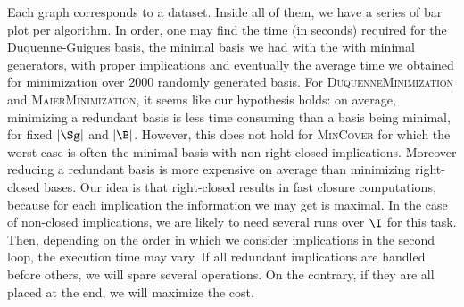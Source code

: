 \vspace{1.2em}

Each graph corresponds to a dataset. Inside all of them, we have a series
of bar plot per algorithm. In order, one may find the time (in seconds) required for the Duquenne-Guigues basis, the minimal basis we had with the
with minimal generators, with proper implications and eventually the average
time we obtained for minimization over 2000 randomly generated basis. For \textsc{DuquenneMinimization} and \textsc{MaierMinimization}, it seems like
our hypothesis holds: on average, minimizing a redundant basis is less time consuming than a basis being minimal, for fixed $|\Sg|$ and $|\B|$. However,
this does not hold for \textsc{MinCover} for which the worst case is often
the minimal basis with non right-closed implications. Moreover reducing a redundant basis is more expensive on average than minimizing right-closed
bases. Our idea is that right-closed results in fast closure computations, because for each implication the information we may get is maximal. In the
case of non-closed implications, we are likely to need several runs over
$\I$ for this task. Then, depending on the order in which we consider implications in the second loop, the execution time may vary. If all redundant
implications are handled before others, we will spare several operations.
On the contrary, if they are all placed at the end, we will maximize the
cost.

\begin{figure}[H]
	
\end{figure}

\vspace{1.2em}

